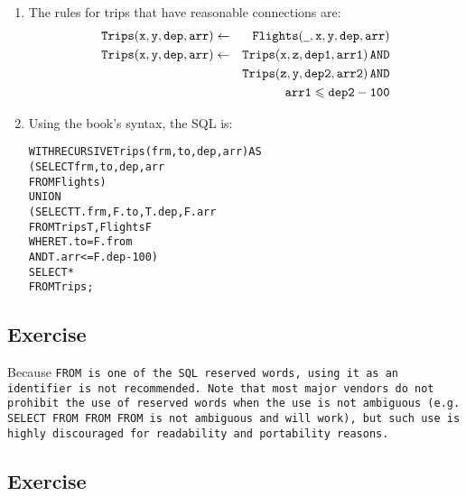 \begin{enumerate}
\item
The rules for trips that have reasonable connections are:\newline
\begin{eqnarray*}
\tt Trips(x,y,dep,arr) &\leftarrow& \tt Flights(\underline{\,\,\,},x,y,dep,arr) \\
\tt Trips(x,y,dep,arr) &\leftarrow& \tt Trips(x,z,dep1,arr1)\, AND \\
& & \tt Trips(z,y,dep2,arr2)\, AND\\
& & \tt arr1 \leqslant dep2-100
\end{eqnarray*}
\item
Using the book's syntax, the SQL is:\newline
\begin{alltt}
WITH RECURSIVE Trips(frm, to, dep, arr) AS
  (SELECT frm, to, dep, arr
   FROM   Flights          )
  UNION
  (SELECT T.frm, F.to, T.dep, F.arr
   FROM   Trips T, Flights F
   WHERE  T.to = F.from
     AND  T.arr <= F.dep - 100     )
SELECT *
FROM   Trips;
\end{alltt}
\end{enumerate}

\setcounter{subsection}{2}
\subsection*{Exercise \thesubsection}
Because \tt FROM \rm is one of the SQL reserved words, using it as an
identifier is not recommended. Note that most major vendors do not
prohibit the use of reserved words when the use is not ambiguous
(e.g. SELECT FROM FROM FROM is not ambiguous and will work), but such
use is highly discouraged for readability and portability reasons.

\setcounter{subsection}{3}
\subsection*{Exercise \thesubsection}

